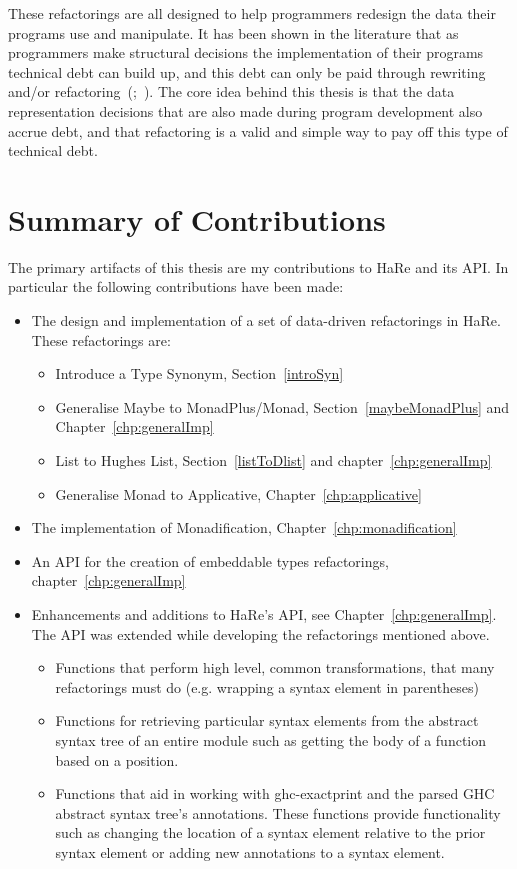 These refactorings are all designed to help programmers redesign the data their programs use and manipulate. It has been shown in the literature that as programmers make structural decisions the implementation of their programs technical debt can build up, and this debt can only be paid through rewriting and/or refactoring~(\cite{techDebt};~\cite{fowler}). The core idea behind this thesis is that the data representation decisions that are also made during program development also accrue debt, and that refactoring is a valid and simple way to pay off this type of technical debt.  

\section{Summary of Contributions}

The primary artifacts of this thesis are my contributions to HaRe and its API. In particular the following contributions have been made:

\begin{itemize}
\item The design and implementation of a set of data-driven refactorings in HaRe. These refactorings are:
	\begin{itemize}
		\item Introduce a Type Synonym, Section~\ref{introSyn}
		\item Generalise Maybe to MonadPlus/Monad, Section~\ref{maybeMonadPlus} and Chapter~\ref{chp:generalImp}
		\item List to Hughes List, Section~\ref{listToDlist} and chapter~\ref{chp:generalImp}
		\item Generalise Monad to Applicative, Chapter~\ref{chp:applicative}		
	\end{itemize}
\item The implementation of Monadification, Chapter~\ref{chp:monadification}	
\item An API for the creation of embeddable types refactorings, chapter~\ref{chp:generalImp}
\item Enhancements and additions to HaRe's API, see Chapter~\ref{chp:generalImp}. The API was extended while developing the refactorings mentioned above.
\begin{itemize}
	\item Functions that perform high level, common transformations, that many refactorings must do (e.g. wrapping a syntax element in parentheses)
	\item Functions for retrieving particular syntax elements from the abstract syntax tree of an entire module such as getting the body of a function based on a position. 
	\item Functions that aid in working with ghc-exactprint and the parsed GHC abstract syntax tree's annotations. These functions provide functionality such as changing the location of a syntax element relative to the prior syntax element or adding new annotations to a syntax element.
\end{itemize}	  
\end{itemize}

